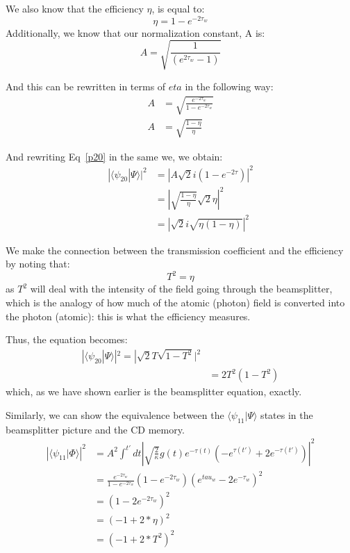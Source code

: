 \documentclass[12pt]{article}
\begin{document}
We also know that the efficiency $\eta$, is equal to:
\begin{equation}
\eta = 1-e^{-2\tau_w}
\end{equation}
Additionally, we know that our normalization constant, A is:
\begin{equation}
A = \sqrt{\frac{1}{\left(  e^{2\tau_w} -1\right)}}
\end{equation}

And this can be rewritten in terms of $eta$ in the following way:
\begin{align}
A &= \sqrt{\frac{e^{-2\tau_w}}{1-e^{-2\tau_w}}}\\
A &=\sqrt{ \frac{1-\eta}{\eta}}
\end{align}

And rewriting Eq~\eqref{p20} in the same we, we obtain:
\begin{align}
|\langle \psi_{20}| \Psi \rangle|^2&= |A  \sqrt{2} i (1-e^{-2\tau})|^2\\
&=| \sqrt{\frac{1-\eta}{\eta}} \sqrt{2} \eta|^2\\ 
&= |  \sqrt{2} i \sqrt{ \eta (1-\eta)}|^2
\end{align}

We make the connection between the transmission coefficient and the efficiency by noting that:
\[
T^2 = \eta
\]
as $T^2$ will deal with the intensity of the field going through the beamsplitter, which is the analogy of how much of the atomic (photon) field is converted into the photon (atomic): this is what the efficiency measures.

Thus, the equation becomes:
\begin{align}
|\langle \psi_{20} | \Psi \rangle|^2 = | \sqrt{2} T\sqrt{1-T^2}|^2 \\
&= 2T^2 (1-T^2)
\end{align}
which, as we have shown earlier is the beamsplitter equation, exactly.

Similarly, we can show the equivalence between the $\langle \psi_{11} | \Psi \rangle$ states in the beamsplitter picture and the CD memory.
\begin{align}
\left | \langle \psi_{11} | \Phi \rangle \right | ^2  &= A^2\int^{t'} dt \left|\sqrt{\frac{2}{\kappa}} g(t) e^{-\tau(t)} \left (- e^{\tau(t')} +2 e^{-\tau(t')} \right ) \right |^2 \\
&= \frac{e^{-2\tau_w}}{1-e^{-2\tau_w}} \left (1- e^{-2\tau_w} \right ) \left ( e^{tau_w}-2e^{-\tau_w} \right )^2\\
&=  \left( 1-2e^{-2\tau_w} \right )^2\\
&= \left ( -1+2*\eta \right )^2\\
&= \left (-1+2*T^2 \right )^2
\end{align}
\end{document}
